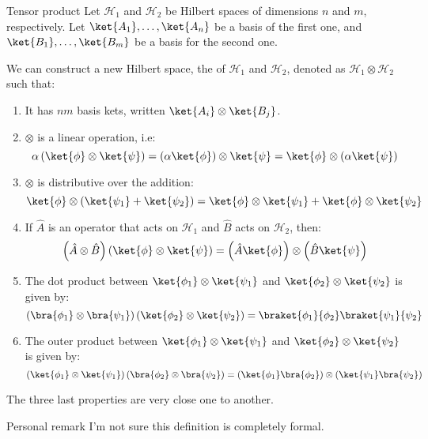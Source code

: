 \documentclass[a4paper]{article}
\begin{document}
\begin{parag}{Tensor product}
    Let $\mathcal{H}_1$ and $\mathcal{H}_2$ be Hilbert spaces of dimensions $n$ and $m$, respectively. Let $\ket{A_1}, \ldots, \ket{A_{n}}$ be a basis of the first one, and $\ket{B_1}, \ldots, \ket{B_m}$ be a basis for the second one.

    We can construct a new Hilbert space, the  of $\mathcal{H}_1$ and $\mathcal{H}_2$, denoted as $\mathcal{H}_1 \otimes \mathcal{H}_2$ such that:
    \begin{enumerate}
        \item It has $nm$ basis kets, written $\ket{A_i} \otimes \ket{B_j}$.
        \item $\otimes$ is a linear operation, i.e: 
        \[\alpha\left(\ket{\phi} \otimes \ket{\psi}\right) = \left(\alpha \ket{\phi}\right) \otimes \ket{\psi} = \ket{\phi} \otimes \left(\alpha \ket{\psi}\right)\]
        \item $\otimes$ is distributive over the addition: 
        \[\ket{\phi} \otimes \left(\ket{\psi_1} + \ket{\psi_2}\right) = \ket{\phi} \otimes \ket{\psi_1} + \ket{\phi} \otimes \ket{\psi_2}\]
        \item If $\hat{A}$ is an operator that acts on $\mathcal{H}_1$ and $\hat{B}$ acts on $\mathcal{H}_2$, then: 
        \[\left(\hat{A} \otimes \hat{B}\right) \left(\ket{\phi}\otimes \ket{\psi}\right) = \left(\hat{A} \ket{\phi}\right) \otimes \left(\hat{B}\ket{\psi}\right)\]
        \item The dot product between $\ket{\phi_1} \otimes \ket{\psi_1}$ and $\ket{\phi_2} \otimes \ket{\psi_2}$ is given by: 
        \[\left(\bra{\phi_1} \otimes \bra{\psi_1}\right) \left(\ket{\phi_2} \otimes \ket{\psi_2}\right) = \braket{\phi_1}{\phi_2}\braket{\psi_1}{\psi_2}\]
        \item The outer product between $\ket{\phi_1} \otimes \ket{\psi_1}$ and $\ket{\phi_2} \otimes \ket{\psi_2}$ is given by: 
        \[\left(\ket{\phi_1} \otimes \ket{\psi_1}\right) \left(\bra{\phi_2} \otimes \bra{\psi_2}\right) = \left(\ket{\phi_1}\bra{\phi_2}\right) \otimes \left(\ket{\psi_1} \bra{\psi_2}\right)\]
    \end{enumerate}

    The three last properties are very close one to another.

    \begin{subparag}{Personal remark}
        I'm not sure this definition is completely formal.
    \end{subparag}
    

\end{parag}
\end{document}
